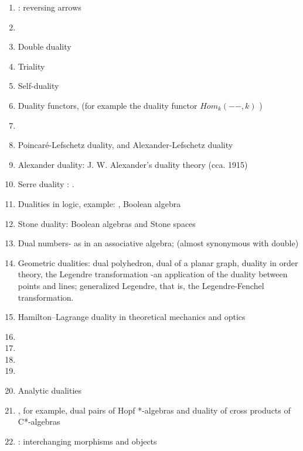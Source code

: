 \documentclass[12pt]{article}
\theoremstyle{plain}
\theoremstyle{definition}
\numberwithin{equation}{section}
\begin{document}
\begin{enumerate}
\item {}: reversing arrows
\item {}
\item Double duality
\item Triality
\item Self-duality
\item Duality functors, (for example the duality functor $Hom_k(--,k)$ )  
\item {}
\item Poincar\'e-Lefschetz duality, and  Alexander-Lefschetz duality
\item Alexander duality: J. W. Alexander's duality theory (cca. 1915)
\item Serre duality : 
.
\item Dualities in logic, example: , Boolean algebra 
\item Stone duality: Boolean algebras and Stone spaces
\item Dual numbers- as in an associative algebra; (almost synonymous with double) 
\item Geometric dualities: dual polyhedron, dual of a planar graph, duality in order theory,
the Legendre transformation -an application of the duality between points and lines; generalized Legendre, that is, the Legendre-Fenchel transformation.
\item Hamilton--Lagrange duality in theoretical mechanics and optics   
\item {}
\item {}
\item {}
\item {}
\item Analytic dualities 
\item {},
for example, dual pairs of Hopf *-algebras and duality of cross products of C*-algebras
\item {}:
interchanging morphisms and objects

\end{enumerate}
\end{document}
